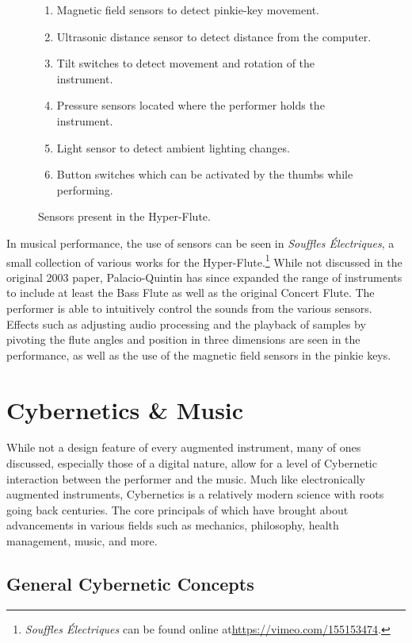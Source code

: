 \begin{figure}
    \centering
    \begin{enumerate}
        \item Magnetic field sensors to detect pinkie-key movement.
        \item Ultrasonic distance sensor to detect distance from the computer.
        \item Tilt switches to detect movement and rotation of the instrument.
        \item Pressure sensors located where the performer holds the instrument.
        \item Light sensor to detect ambient lighting changes.
        \item Button switches which can be activated by the thumbs while performing.
    \end{enumerate}
    \caption{Sensors present in the Hyper-Flute.}
    \label{fig:hyper-flute-sensors}
\end{figure}

In musical performance, the use of sensors can be seen in \textit{Souffles Électriques}, a small collection of various works for the Hyper-Flute.\footnote{\textit{Souffles Électriques} can be found online at\url{https://vimeo.com/155153474}.} While not discussed in the original 2003 paper, Palacio-Quintin has since expanded the range of instruments to include at least the Bass Flute as well as the original Concert Flute. The performer is able to intuitively control the sounds from the various sensors. Effects such as adjusting audio processing and the playback of samples by pivoting the flute angles and position in three dimensions are seen in the performance, as well as the use of the magnetic field sensors in the pinkie keys.


\section{Cybernetics \& Music}
While not a design feature of every augmented instrument, many of ones discussed, especially those of a digital nature, allow for a level of Cybernetic interaction between the performer and the music. Much like electronically augmented instruments, Cybernetics is a relatively modern science with roots going back centuries. The core principals of which have brought about advancements in various fields such as mechanics, philosophy, health management, music, and more. 

\subsection{General Cybernetic Concepts} %

